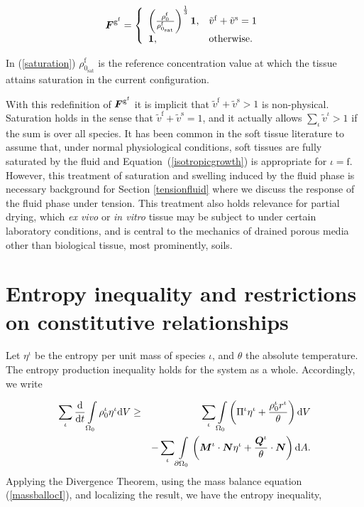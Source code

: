 \begin{equation}
\mbox{\boldmath$ F$}^{\mathrm{g}^\mathrm{f}} = \left\{ \begin{array}{ll}  \left(
\frac{\rho_0^\mathrm{f}}{\rho_{0_{\mathrm{sat}}}^\mathrm{f}} \right)^
{\frac{1}{3}}{\bf 1},&
\tilde{v}^\mathrm{f} + \tilde{v}^\mathrm{s} = 1 \\ {\bf 1},& \mathrm{otherwise.}
\end{array}\right.
\label{saturation}
\end{equation}

\noindent In (\ref{saturation}) $\rho_{0_{\mathrm{sat}}}^\mathrm{f}$
is the reference concentration value at which the tissue attains saturation
in the current configuration.

With this redefinition of $\mbox{\boldmath$ F$}^{\mathrm{g}^\mathrm{f}}$ it is implicit
that $\tilde{v}^\mathrm{f} + \tilde{v}^\mathrm{s} > 1$ is
non-physical. Saturation holds in the sense that $\tilde{v}^\mathrm{f} +
\tilde{v}^\mathrm{s} = 1$, and it actually allows $\sum_\iota
\tilde{v}^\iota > 1$ if the sum is over all species. It has been
common in the soft tissue literature to assume that, 
under normal physiological 
conditions, soft tissues are fully saturated by the fluid and
\mbox{Equation~(\ref{isotropicgrowth})} is appropriate for $\iota =
\mathrm{f}$. However, this treatment of saturation and swelling
induced by the fluid phase is necessary background for Section
\ref{tensionfluid} where we 
discuss the response of the fluid phase under tension. This treatment
also holds relevance for partial drying,
which \emph{ex vivo} or \emph{in vitro} tissue may be subject to under
certain laboratory conditions, and is central to the mechanics of
drained porous media other than biological tissue, most prominently,
soils.

\section{Entropy inequality and restrictions on constitutive
  relationships}
\label{entropy-inequality}

Let $\eta^\iota$ be the entropy per unit mass of species $\iota$,
and $\theta$ the absolute temperature. The entropy production
inequality holds for the system as a whole. Accordingly, we write

\begin{eqnarray}
\sum\limits_{\iota}\frac{\mathrm{d}}{\mathrm{d}t}
\int\limits_{\Omega_0} \rho_0^\iota \eta^\iota \mathrm{d}V &\geq&
\sum\limits_{\iota}\int\limits_{\Omega_0}\left(
\Pi^\iota \eta^\iota + \frac{\rho_0^\iota r^\iota}{\theta}\right) \mathrm{d}V\nonumber\\
& & - \sum\limits_{\iota}\int\limits_{\partial \Omega_0}
\left(\mbox{\boldmath$ M$}^\iota \cdot \mbox{\boldmath$ N$}\eta^\iota + \frac{\mbox{\boldmath$ Q$}^\iota}{\theta}
\cdot \mbox{\boldmath$ N$} \right)\mathrm{d}A.
\end{eqnarray}
\noindent Applying the Divergence Theorem, using the mass balance
equation (\ref{massballocI}), and localizing the result, we have
the entropy inequality,

